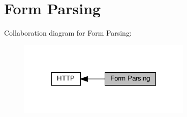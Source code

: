 \hypertarget{group__form-parsing}{}\section{Form Parsing}
\label{group__form-parsing}
Collaboration diagram for Form Parsing\+:
\nopagebreak
\begin{figure}[H]
\begin{center}
\leavevmode
\includegraphics[width=234pt]{group__form-parsing}
\end{center}
\end{figure}
